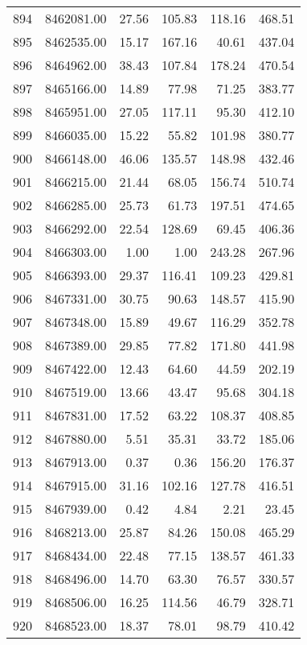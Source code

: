 \begin{table}[ht]
\begin{tabular}{rrrrrr}
  894 & 8462081.00 & 27.56 & 105.83 & 118.16 & 468.51 \\ 
  895 & 8462535.00 & 15.17 & 167.16 & 40.61 & 437.04 \\ 
  896 & 8464962.00 & 38.43 & 107.84 & 178.24 & 470.54 \\ 
  897 & 8465166.00 & 14.89 & 77.98 & 71.25 & 383.77 \\ 
  898 & 8465951.00 & 27.05 & 117.11 & 95.30 & 412.10 \\ 
  899 & 8466035.00 & 15.22 & 55.82 & 101.98 & 380.77 \\ 
  900 & 8466148.00 & 46.06 & 135.57 & 148.98 & 432.46 \\ 
  901 & 8466215.00 & 21.44 & 68.05 & 156.74 & 510.74 \\ 
  902 & 8466285.00 & 25.73 & 61.73 & 197.51 & 474.65 \\ 
  903 & 8466292.00 & 22.54 & 128.69 & 69.45 & 406.36 \\ 
  904 & 8466303.00 & 1.00 & 1.00 & 243.28 & 267.96 \\ 
  905 & 8466393.00 & 29.37 & 116.41 & 109.23 & 429.81 \\ 
  906 & 8467331.00 & 30.75 & 90.63 & 148.57 & 415.90 \\ 
  907 & 8467348.00 & 15.89 & 49.67 & 116.29 & 352.78 \\ 
  908 & 8467389.00 & 29.85 & 77.82 & 171.80 & 441.98 \\ 
  909 & 8467422.00 & 12.43 & 64.60 & 44.59 & 202.19 \\ 
  910 & 8467519.00 & 13.66 & 43.47 & 95.68 & 304.18 \\ 
  911 & 8467831.00 & 17.52 & 63.22 & 108.37 & 408.85 \\ 
  912 & 8467880.00 & 5.51 & 35.31 & 33.72 & 185.06 \\ 
  913 & 8467913.00 & 0.37 & 0.36 & 156.20 & 176.37 \\ 
  914 & 8467915.00 & 31.16 & 102.16 & 127.78 & 416.51 \\ 
  915 & 8467939.00 & 0.42 & 4.84 & 2.21 & 23.45 \\ 
  916 & 8468213.00 & 25.87 & 84.26 & 150.08 & 465.29 \\ 
  917 & 8468434.00 & 22.48 & 77.15 & 138.57 & 461.33 \\ 
  918 & 8468496.00 & 14.70 & 63.30 & 76.57 & 330.57 \\ 
  919 & 8468506.00 & 16.25 & 114.56 & 46.79 & 328.71 \\ 
  920 & 8468523.00 & 18.37 & 78.01 & 98.79 & 410.42 \\ 

\end{tabular}
\end{table}
